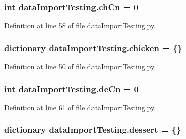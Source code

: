 \hypertarget{namespacedataImportTesting_a51b52c546e3213eab15e8b7f8d9bff15}{
\subsubsection[{ch\-Cn}]{\setlength{\rightskip}{0pt plus 5cm}int data\-Import\-Testing.\-ch\-Cn = 0}}\label{namespacedataImportTesting_a51b52c546e3213eab15e8b7f8d9bff15}


Definition at line 58 of file data\-Import\-Testing.\-py.

\hypertarget{namespacedataImportTesting_a4d7ac133c76e4761200c8568cff1c6ed}{
\subsubsection[{chicken}]{\setlength{\rightskip}{0pt plus 5cm}dictionary data\-Import\-Testing.\-chicken = \{\}}}\label{namespacedataImportTesting_a4d7ac133c76e4761200c8568cff1c6ed}


Definition at line 50 of file data\-Import\-Testing.\-py.

\hypertarget{namespacedataImportTesting_a5ece02faad1e1d416f59cfc4765c5f19}{
\subsubsection[{de\-Cn}]{\setlength{\rightskip}{0pt plus 5cm}int data\-Import\-Testing.\-de\-Cn = 0}}\label{namespacedataImportTesting_a5ece02faad1e1d416f59cfc4765c5f19}


Definition at line 61 of file data\-Import\-Testing.\-py.

\hypertarget{namespacedataImportTesting_a1ef0d0854303f87407db65707459891a}{
\subsubsection[{dessert}]{\setlength{\rightskip}{0pt plus 5cm}dictionary data\-Import\-Testing.\-dessert = \{\}}}\label{namespacedataImportTesting_a1ef0d0854303f87407db65707459891a}



